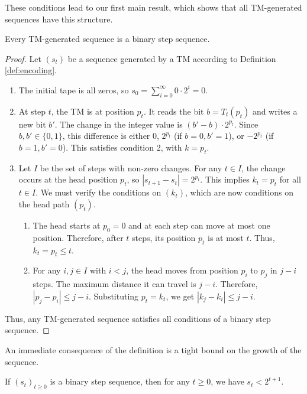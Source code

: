 These conditions lead to our first main result, which shows that all TM-generated sequences have this structure.

\begin{theorem}
\label{thm:forward_characterization}
\leanok
{}
Every TM-generated sequence is a binary step sequence.
\end{theorem}

\begin{proof}
Let $(s_t)$ be a sequence generated by a TM according to Definition \ref{def:encoding}.
\begin{enumerate}
\item The initial tape is all zeros, so $s_0 = \sum_{i=0}^\infty 0 \cdot 2^i = 0$.
\item At step $t$, the TM is at position $p_t$. It reads the bit $b = T_t(p_t)$ and writes a new bit $b'$. The change in the integer value is $(b' - b) \cdot 2^{p_t}$. Since $b, b' \in \{0, 1\}$, this difference is either $0$, $2^{p_t}$ (if $b=0, b'=1$), or $-2^{p_t}$ (if $b=1, b'=0$). This satisfies condition 2, with $k = p_t$.
\item Let $I$ be the set of steps with non-zero changes. For any $t \in I$, the change occurs at the head position $p_t$, so $|s_{t+1} - s_t| = 2^{p_t}$. This implies $k_t = p_t$ for all $t \in I$. We must verify the conditions on $(k_t)$, which are now conditions on the head path $(p_t)$.
    \begin{enumerate}
    \item The head starts at $p_0=0$ and at each step can move at most one position. Therefore, after $t$ steps, its position $p_t$ is at most $t$. Thus, $k_t = p_t \leq t$.
    \item For any $i, j \in I$ with $i < j$, the head moves from position $p_i$ to $p_j$ in $j-i$ steps. The maximum distance it can travel is $j-i$. Therefore, $|p_j - p_i| \leq j-i$. Substituting $p_t=k_t$, we get $|k_j - k_i| \leq j-i$.
    \end{enumerate}
\end{enumerate}
Thus, any TM-generated sequence satisfies all conditions of a binary step sequence.
\end{proof}

An immediate consequence of the definition is a tight bound on the growth of the sequence.

\begin{theorem}
\label{thm:growth_bound}
\leanok
{}
If $(s_t)_{t \geq 0}$ is a binary step sequence, then for any $t \geq 0$, we have $s_t < 2^{t+1}$.
\end{theorem}

